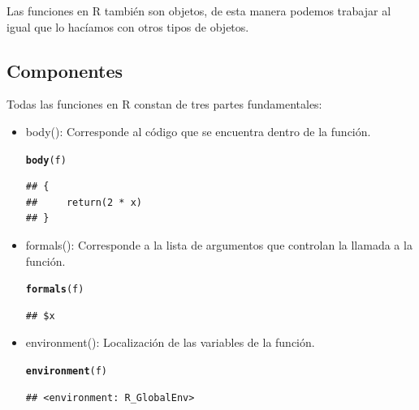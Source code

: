 \documentclass[11pt,a4paper,oneside]{book}\usepackage[]{graphicx}\usepackage[]{color}
\makeatletter
\newcommand{\hlstd}[1]{\textcolor[rgb]{0.345,0.345,0.345}{#1}}%
\newcommand{\hlkwd}[1]{\textcolor[rgb]{0.737,0.353,0.396}{\textbf{#1}}}%
\newenvironment{kframe}{%
 \def\at@end@of@kframe{}%
 \ifinner\ifhmode%
  \def\at@end@of@kframe{\end{minipage}}%
  \begin{minipage}{\columnwidth}%
 \fi\fi%
 \def\FrameCommand##1{\hskip\@totalleftmargin \hskip-\fboxsep
 \colorbox{shadecolor}{##1}\hskip-\fboxsep
     \hskip-\linewidth \hskip-\@totalleftmargin \hskip\columnwidth}%
 \MakeFramed {\advance\hsize-\width
   \@totalleftmargin\z@ \linewidth\hsize
   \@setminipage}}%
 {\par\unskip\endMakeFramed%
 \at@end@of@kframe}
\newenvironment{knitrout}{}{} %
\makeatother
\begin{document}
\begin{itemize}
Las funciones en R también son objetos, de esta manera podemos trabajar al igual que lo hacíamos con otros tipos de objetos.

\subsection{Componentes}

Todas las funciones en R constan de tres partes fundamentales:

\begin{itemize}
   \item body(): Corresponde al código que se encuentra dentro de la función.
\begin{knitrout}
\color{fgcolor}\begin{kframe}
\begin{alltt}
\hlkwd{body}\hlstd{(f)}
\end{alltt}
\begin{verbatim}
## {
##     return(2 * x)
## }
\end{verbatim}
\end{kframe}
\end{knitrout}
   \item formals(): Corresponde a la lista de argumentos que controlan la llamada a la función.
\begin{knitrout}
\color{fgcolor}\begin{kframe}
\begin{alltt}
\hlkwd{formals}\hlstd{(f)}
\end{alltt}
\begin{verbatim}
## $x
\end{verbatim}
\end{kframe}
\end{knitrout}
   \item environment(): Localización de las variables de la función.
\begin{knitrout}
\color{fgcolor}\begin{kframe}
\begin{alltt}
\hlkwd{environment}\hlstd{(f)}
\end{alltt}
\begin{verbatim}
## <environment: R_GlobalEnv>
\end{verbatim}
\end{kframe}
\end{knitrout}
\end{itemize}


\end{itemize}
\end{document}

